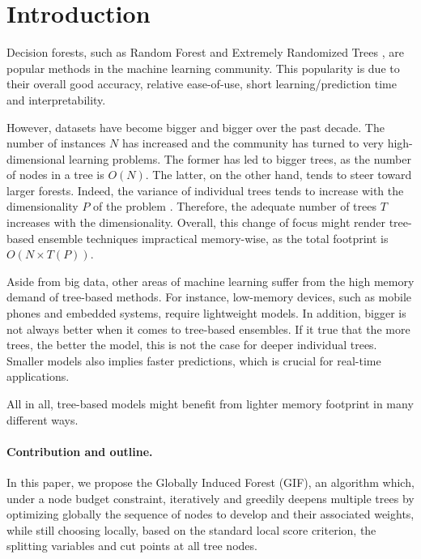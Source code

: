\documentclass{article}
\begin{document}
\section{Introduction}
\label{sec:introduction}

Decision forests, such as Random Forest \cite{breiman2001random} and
Extremely Randomized Trees \cite{extratrees}, are popular methods in
the machine learning community. This popularity is due to their
overall good accuracy, relative ease-of-use, short learning/prediction
time and interpretability. 

However, datasets have become bigger and bigger over the past decade. The 
number of instances $N$ has increased and the community has turned to very 
high-dimensional learning problems. The former has led to bigger trees, as the 
number of nodes in a tree is $O(N)$. The latter, on the other hand, tends to 
steer toward larger forests. Indeed, the variance of individual trees tends to 
increase with the dimensionality $P$ of the problem \cite{l1basedcomp}. 
Therefore, the adequate number of trees $T$ increases with the dimensionality. 
Overall, this change of focus might render tree-based ensemble techniques 
impractical memory-wise, as the total footprint is $O(N \times T(P))$. 

Aside from big data, other areas of machine learning suffer from the
high memory demand of tree-based methods. For instance, low-memory
devices, such as mobile phones and embedded systems, require
lightweight models. In addition, bigger is not always better when it
comes to tree-based ensembles.  If it true that the more trees, the
better the model, this is not the case for deeper individual trees.
Smaller models also implies faster predictions, which is crucial for
real-time applications.

All in all, tree-based models might benefit from lighter memory
footprint in many different ways.

\vspace*{-\baselineskip}

\paragraph{Contribution and outline.}
In this paper, we propose the Globally Induced Forest (GIF), an algorithm 
which, under a node budget constraint, iteratively and greedily deepens 
multiple 
trees by optimizing globally the sequence of nodes to develop and their 
associated weights, while still choosing locally, based on the standard local 
score criterion, the splitting variables and cut points at all tree nodes. 
\end{document}
